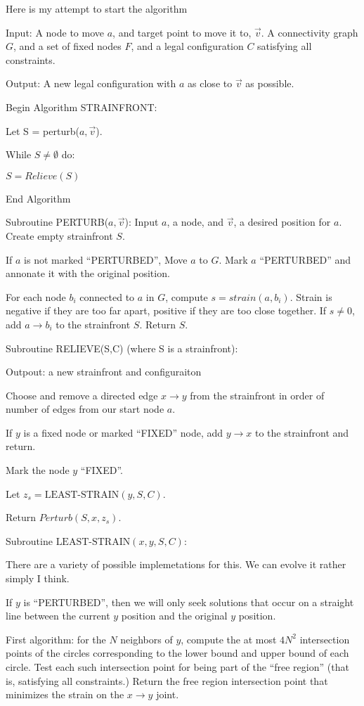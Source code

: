 \documentclass[11pt]{article}
\begin{document}
Here is my attempt to start the algorithm

Input: A node to move $a$, and target point to move it to, $\vec{v}$.
A connectivity graph $G$, and a set of fixed nodes $F$, and
a legal configuration $C$ satisfying all constraints.

Output: A new legal configuration with $a$ as close to $\vec{v}$ as possible.

Begin Algorithm STRAINFRONT:

Let S = perturb($a,\vec{v}$).

While $S \neq \emptyset$ do:

$ S = Relieve(S) $

End Algorithm


Subroutine PERTURB($a,\vec{v}$):
Input $a$, a node, and $\vec{v}$, a desired position for $a$.
Create empty strainfront $S$.

If $a$ is not marked ``PERTURBED'', Move $a$ to $G$.
Mark $a$ ``PERTURBED'' and annonate it with the original position.

For each node $b_i$ connected  to $a$ in $G$,
compute $s = strain(a,b_i)$. Strain is negative if they are too far apart,
positive if they are too close together.
If $s \neq 0$, add  $a \rightarrow b_i$ to the strainfront $S$. Return $S$.

Subroutine RELIEVE(S,C) (where S is a strainfront):

Outpout: a new strainfront and configuraiton

Choose and remove a directed edge $x \rightarrow y$ from the strainfront in order
of number of edges from our start node $a$.

If $y$ is a fixed node or marked ``FIXED'' node, add $y \rightarrow x$ to the strainfront and return.

Mark the node $y$ ``FIXED''.

Let $z_s = \text{LEAST-STRAIN}(y,S,C)$.

Return $Perturb(S,x,z_s)$.

Subroutine $\text{LEAST-STRAIN}(x,y,S,C)$:

There are a variety of possible implemetations for this.  We can evolve it
rather simply I think.

If $y$ is ``PERTURBED'', then we will only seek solutions that occur on a straight line
between the current $y$ position and the original $y$ position.

First algorithm: for the $N$ neighbors of $y$, compute the at most $4N^2$ intersection points
of the circles corresponding to the lower bound and upper bound of each circle. Test
each such intersection point for being part of the ``free region'' (that is, satisfying all
constraints.)  Return the free region intersection point that minimizes the strain on the
$x \rightarrow y$ joint.
\end{document}
